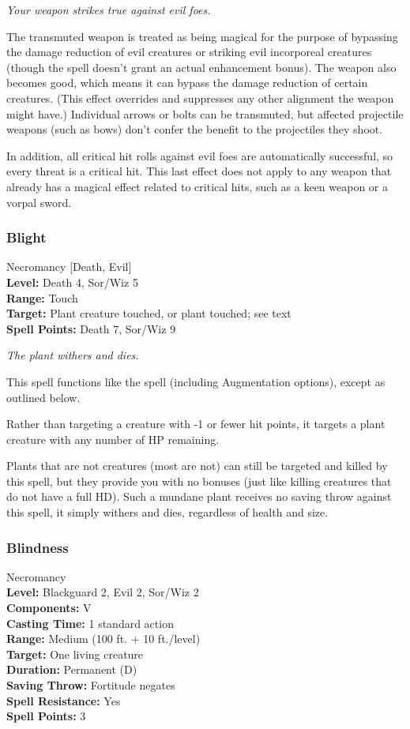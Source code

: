 \emph{Your weapon strikes true against evil foes.}

The transmuted weapon is treated as being magical for the purpose of bypassing the damage reduction of evil creatures or striking evil incorporeal creatures (though the spell doesn't grant an actual enhancement bonus). 
The weapon also becomes good, which means it can bypass the damage reduction of certain creatures. 
(This effect overrides and suppresses any other alignment the weapon might have.) 
Individual arrows or bolts can be transmuted, but affected projectile weapons (such as bows) don't confer the benefit to the projectiles they shoot.

In addition, all critical hit rolls against evil foes are automatically successful, so every threat is a critical hit. 
This last effect does not apply to any weapon that already has a magical effect related to critical hits, such as a keen weapon or a vorpal sword.
\subsubsection{Blight}
\label{Spell:Blight}
Necromancy [Death, Evil]
\\ \textbf{Level:} Death 4, Sor/Wiz 5
\\ \textbf{Range:} Touch
\\ \textbf{Target:} Plant creature touched, or plant touched; see text
\\ \textbf{Spell Points:} Death 7, Sor/Wiz 9

\emph{The plant withers and dies.}

This spell functions like the  spell (including Augmentation options), 
except as outlined below.

Rather than targeting a creature with -1 or fewer hit points, it targets a plant creature with any number of HP remaining.

Plants that are not creatures (most are not) can still be targeted and killed by this spell,
but they provide you with no bonuses (just like killing creatures that do not have a full HD).
Such a mundane plant receives no saving throw against this spell, it simply withers and dies,
regardless of health and size.
\subsubsection{Blindness}
\label{Spell:Blindness}
Necromancy
\\ \textbf{Level:} Blackguard 2, Evil 2, Sor/Wiz 2
\\ \textbf{Components:} V
\\ \textbf{Casting Time:} 1 standard action
\\ \textbf{Range:} Medium (100 ft. + 10 ft./level)
\\ \textbf{Target:} One living creature
\\ \textbf{Duration:} Permanent (D)
\\ \textbf{Saving Throw:} Fortitude negates
\\ \textbf{Spell Resistance:} Yes
\\ \textbf{Spell Points:} 3

